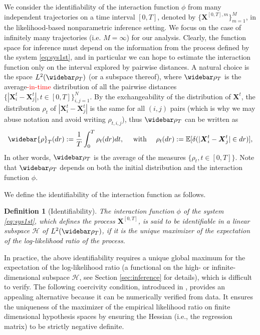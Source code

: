 \documentclass[]{elsarticle}
\def\E{\mathbb{E}}
\newcommand{\wbar}\widebar
\newcommand{\mbf}[1]{\boldsymbol{#1}}
\newcommand{\bX}{\mbf{X}}
\newcommand{\hypspace}{\mathcal{H}}
\newtheorem{definition}[theorem]{Definition}
\numberwithin{equation}{section}
\numberwithin{theorem}{section}
\begin{document}
We consider the identifiability of the interaction function $\phi$ from many independent trajectories on a time interval $[0,T]$, denoted by $\{\bX^{[0,T],m}\}_{m=1}^M$, in the likelihood-based nonparametric inference setting. We focus on the case of infinitely many trajectories (i.e. $M=\infty$) for our analysis. Clearly, the function space for inference must depend on the information from the process defined by the system \eqref{eq:sys1st}, and in particular we can hope to estimate the interaction function only on the interval explored by pairwise distances.  A natural choice is the space  $L^2(\wbar \rho_T)$ (or a subspace thereof), where $\wbar \rho_T$ is the average\textcolor{red}{-in-time} distribution of all the pairwise distances $\{|\bX_i^t-\bX_{j}^t|, t\in [0,T]\}_{i,j=1}^N$. By the exchangeability of the distribution of $\bX^t$, the distribution $\rho_t$ of $|\bX_i^t-\bX_{j}^t|$ is the same for all $(i,j)$ pairs (which is why we may abuse notation and avoid writing $\rho_{t,i,j}$), thus $\wbar \rho_T$ can be written as
 \begin{equation} \label{eq:rhoavg} 
  \wbar{\rho}_T(dr) : = \frac{1}{T} \int_0^T \rho_t(dr) dt, \quad\text{ with }\quad \rho_t(dr) : =  \E[\delta(|\bX_i^t-\bX_{j}^t|\in dr)], 
 \end{equation}
In other words, $\wbar \rho_T$ is the average of the measures $\{\rho_t, t\in[0,T] \}$. Note that $\wbar \rho_T$ depends on both the initial distribution and the interaction function $\phi$. 

We define the identifiability of the interaction function as follows. 


\begin{definition}[Identifiability]\label{def:identifiability} 
The interaction function $\phi$ of the system \eqref{eq:sys1st}, which defines the process $\bX^{[0,T]}$, is said to be identifiable in a linear subspace $\hypspace$ of $L^2(\wbar\rho_T)$, if it is the unique maximizer of the expectation of the log-likelihood ratio of the process.%
\end{definition}

In practice, the above identifiability requires a unique global maximum for the expectation of the log-likelihood ratio (a functional on the high- or infinite-dimensional subspace $\hypspace$, see Section \ref{sec:inference} for details), which is difficult to verify. The following coercivity condition, introduced in  \cite{BFHM17,LZTM19,LMT19,LMT20}, provides an appealing alternative because it can be numerically verified from data. It ensures the uniqueness of the maximizer of the empirical likelihood ratio on finite dimensional hypothesis spaces by ensuring the Hessian (i.e., the regression matrix) to be strictly negative definite.
 
\end{document}
